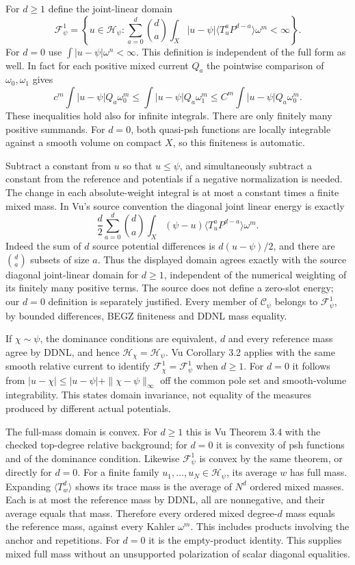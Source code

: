 \documentclass[
  11pt,
]{article}
\begin{document}
For \(d\geq1\) define the joint-linear domain \[
\mathcal F^1_\psi=\left\{u\in\mathcal H_\psi:
\sum_{a=0}^d\binom da\int_X|u-\psi|\langle T_u^aP^{d-a}\rangle\omega^m<\infty\right\}.
\] For \(d=0\) use \(\int|u-\psi|\omega^n<\infty\). This definition is
independent of the full form as well. In fact for each positive mixed
current \(Q_a\) the pointwise comparison of \(\omega_0,\omega_1\) gives
\[
c^m\int|u-\psi|Q_a\omega_0^m\leq\int|u-\psi|Q_a\omega_1^m
\leq C^m\int|u-\psi|Q_a\omega_0^m.
\] These inequalities hold also for infinite integrals. There are only
finitely many positive summands. For \(d=0\), both quasi-psh functions
are locally integrable against a smooth volume on compact \(X\), so this
finiteness is automatic.

Subtract a constant from \(u\) so that \(u\leq\psi\), and simultaneously
subtract a constant from the reference and potentials if a negative
normalization is needed. The change in each absolute-weight integral is
at most a constant times a finite mixed mass. In Vu's source convention
the diagonal joint linear energy is exactly \[
\frac d2\sum_{a=0}^d\binom da\int_X(\psi-u)\langle T_u^aP^{d-a}\rangle\omega^m.
\] Indeed the sum of \(d\) source potential differences is
\(d(u-\psi)/2\), and there are \(\binom da\) subsets of size \(a\). Thus
the displayed domain agrees exactly with the source diagonal
joint-linear domain for \(d\geq1\), independent of the numerical
weighting of its finitely many positive terms. The source does not
define a zero-slot energy; our \(d=0\) definition is separately
justified. Every member of \(\mathcal C_\psi\) belongs to
\(\mathcal F^1_\psi\), by bounded differences, BEGZ finiteness and DDNL
mass equality.

If \(\chi\sim\psi\), the dominance conditions are equivalent, \(d\) and
every reference mass agree by DDNL, and hence
\(\mathcal H_\chi=\mathcal H_\psi\). Vu Corollary 3.2 applies with the
same smooth relative current to identify
\(\mathcal F^1_\chi=\mathcal F^1_\psi\) when \(d\geq1\). For \(d=0\) it
follows from \(|u-\chi|\leq|u-\psi|+\|\chi-\psi\|_\infty\) off the
common pole set and smooth-volume integrability. This states domain
invariance, not equality of the measures produced by different actual
potentials.

The full-mass domain is convex. For \(d\geq1\) this is Vu Theorem 3.4
with the checked top-degree relative background; for \(d=0\) it is
convexity of psh functions and of the dominance condition. Likewise
\(\mathcal F^1_\psi\) is convex by the same theorem, or directly for
\(d=0\). For a finite family \(u_1,\ldots,u_N\in\mathcal H_\psi\), its
average \(w\) has full mass. Expanding \(\langle T_w^d\rangle\) shows
its trace mass is the average of \(N^d\) ordered mixed masses. Each is
at most the reference mass by DDNL, all are nonnegative, and their
average equals that mass. Therefore every ordered mixed degree-\(d\)
mass equals the reference mass, against every Kahler \(\omega^m\). This
includes products involving the anchor and repetitions. For \(d=0\) it
is the empty-product identity. This supplies mixed full mass without an
unsupported polarization of scalar diagonal equalities.
\end{document}
